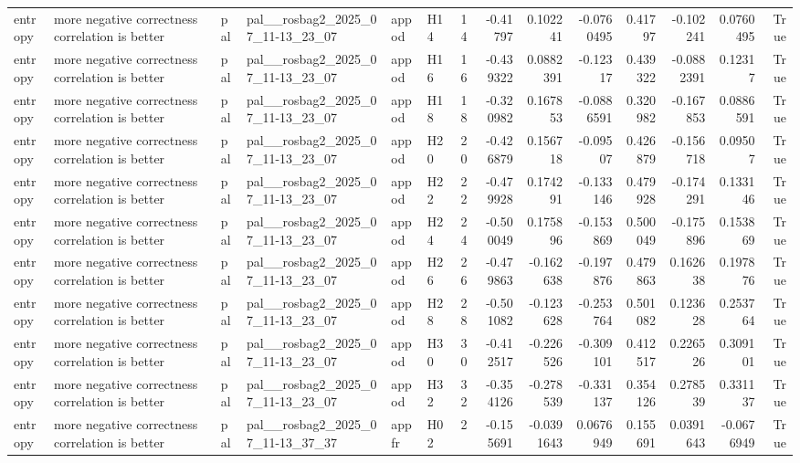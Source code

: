 \begin{longtable}{llllllrrrrrrrr}
entropy & more negative correctness correlation is better & pal & pal\_\_rosbag2\_2025\_07\_11-13\_23\_07 & appod & H14 & 14 & -0.41797 & 0.102241 & -0.0760495 & 0.41797 & -0.102241 & 0.0760495 & True \\
entropy & more negative correctness correlation is better & pal & pal\_\_rosbag2\_2025\_07\_11-13\_23\_07 & appod & H16 & 16 & -0.439322 & 0.0882391 & -0.12317 & 0.439322 & -0.0882391 & 0.12317 & True \\
entropy & more negative correctness correlation is better & pal & pal\_\_rosbag2\_2025\_07\_11-13\_23\_07 & appod & H18 & 18 & -0.320982 & 0.167853 & -0.0886591 & 0.320982 & -0.167853 & 0.0886591 & True \\
entropy & more negative correctness correlation is better & pal & pal\_\_rosbag2\_2025\_07\_11-13\_23\_07 & appod & H20 & 20 & -0.426879 & 0.156718 & -0.09507 & 0.426879 & -0.156718 & 0.09507 & True \\
entropy & more negative correctness correlation is better & pal & pal\_\_rosbag2\_2025\_07\_11-13\_23\_07 & appod & H22 & 22 & -0.479928 & 0.174291 & -0.133146 & 0.479928 & -0.174291 & 0.133146 & True \\
entropy & more negative correctness correlation is better & pal & pal\_\_rosbag2\_2025\_07\_11-13\_23\_07 & appod & H24 & 24 & -0.500049 & 0.175896 & -0.153869 & 0.500049 & -0.175896 & 0.153869 & True \\
entropy & more negative correctness correlation is better & pal & pal\_\_rosbag2\_2025\_07\_11-13\_23\_07 & appod & H26 & 26 & -0.479863 & -0.162638 & -0.197876 & 0.479863 & 0.162638 & 0.197876 & True \\
entropy & more negative correctness correlation is better & pal & pal\_\_rosbag2\_2025\_07\_11-13\_23\_07 & appod & H28 & 28 & -0.501082 & -0.123628 & -0.253764 & 0.501082 & 0.123628 & 0.253764 & True \\
entropy & more negative correctness correlation is better & pal & pal\_\_rosbag2\_2025\_07\_11-13\_23\_07 & appod & H30 & 30 & -0.412517 & -0.226526 & -0.309101 & 0.412517 & 0.226526 & 0.309101 & True \\
entropy & more negative correctness correlation is better & pal & pal\_\_rosbag2\_2025\_07\_11-13\_23\_07 & appod & H32 & 32 & -0.354126 & -0.278539 & -0.331137 & 0.354126 & 0.278539 & 0.331137 & True \\
entropy & more negative correctness correlation is better & pal & pal\_\_rosbag2\_2025\_07\_11-13\_37\_37 & appfr & H02 & 2 & -0.155691 & -0.0391643 & 0.0676949 & 0.155691 & 0.0391643 & -0.0676949 & True \\

\end{longtable}
